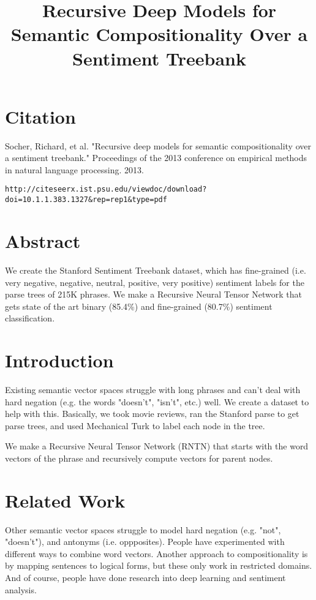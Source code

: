 \documentclass[a4paper]{article}
\title{Recursive Deep Models for Semantic Compositionality Over a Sentiment Treebank}
\date{}
\begin{document}
\maketitle

\section{Citation}
Socher, Richard, et al. "Recursive deep models for semantic compositionality over a sentiment treebank." Proceedings of the 2013 conference on empirical methods in natural language processing. 2013.

\begin{verbatim}
http://citeseerx.ist.psu.edu/viewdoc/download?doi=10.1.1.383.1327&rep=rep1&type=pdf
\end{verbatim}


\section{Abstract}
We create the Stanford Sentiment Treebank dataset, which has fine-grained (i.e.
very negative, negative, neutral, positive, very positive) sentiment labels
for the parse trees of 215K phrases. We make a Recursive Neural Tensor Network
that gets state of the art binary (85.4\%) and fine-grained (80.7\%) sentiment
classification.

\section{Introduction}
Existing semantic vector spaces struggle with long phrases and can't deal
with hard negation (e.g. the words "doesn't", "isn't", etc.) well. We create
a dataset to help with this. Basically, we took movie reviews, ran the Stanford
parse to get parse trees, and used Mechanical Turk to label each node in the
tree.

We make a Recursive Neural Tensor Network (RNTN) that starts with the word
vectors of the phrase and recursively compute vectors for parent nodes.

\section{Related Work}
Other semantic vector spaces struggle to model hard negation (e.g. "not",
"doesn't"), and antonyms (i.e. oppposites). People have experimented with
different ways to combine word vectors. Another approach to compositionality
is by mapping sentences to logical forms, but these only work in restricted
domains. And of course, people have done research into deep learning
and sentiment analysis.
\end{document}
